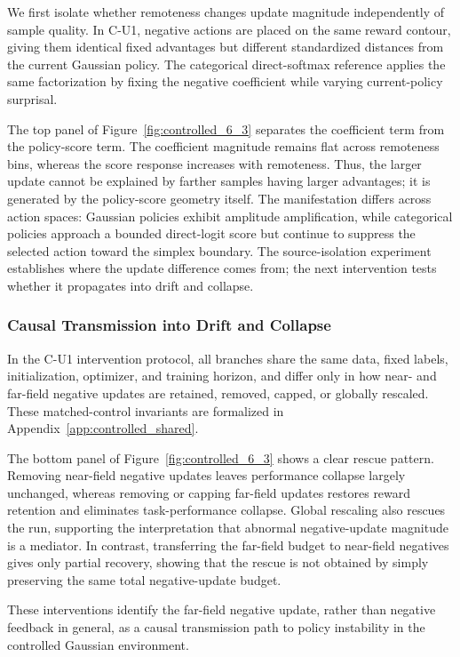 \documentclass{article}
\theoremstyle{plain}
\theoremstyle{definition}
\theoremstyle{remark}
\begin{document}
We first isolate whether remoteness changes update magnitude independently of
sample quality. In C-U1, negative actions are
placed on the same reward contour, giving them identical fixed
advantages but different standardized distances from the current
Gaussian policy. The categorical direct-softmax reference applies the
same factorization by fixing the negative coefficient while varying
current-policy surprisal.

The top panel of Figure~\ref{fig:controlled_6_3} separates the
coefficient term from the policy-score term. The coefficient magnitude
remains flat across remoteness bins, whereas the score response increases
with remoteness. Thus, the larger update cannot be explained
by farther samples having larger advantages; it is generated by the
policy-score geometry itself. The manifestation differs across action
spaces: Gaussian policies exhibit amplitude amplification, while
categorical policies approach a bounded direct-logit score but continue
to suppress the selected action toward the simplex boundary. The source-isolation experiment establishes where the update difference comes
from; the next intervention tests whether it propagates into drift and
collapse.

\subsubsection{Causal Transmission into Drift and Collapse}
\label{sec:controlled_transmission}

In the C-U1 intervention protocol, all branches share the
same data, fixed labels, initialization, optimizer, and training horizon,
and differ only in how near- and far-field negative updates are retained,
removed, capped, or globally rescaled. These matched-control invariants are
formalized in Appendix~\ref{app:controlled_shared}.

The bottom panel of Figure~\ref{fig:controlled_6_3} shows a clear rescue
pattern. Removing near-field negative updates leaves performance collapse
largely unchanged, whereas removing or capping far-field updates restores
reward retention and eliminates task-performance collapse. Global
rescaling also rescues the run, supporting the interpretation that
abnormal negative-update magnitude is a mediator. In contrast,
transferring the far-field budget to near-field negatives gives only
partial recovery, showing that the rescue is not obtained by simply
preserving the same total negative-update budget.

These interventions identify the far-field negative update, rather than
negative feedback in general, as a causal transmission path to policy
instability in the controlled Gaussian environment.
\end{document}
